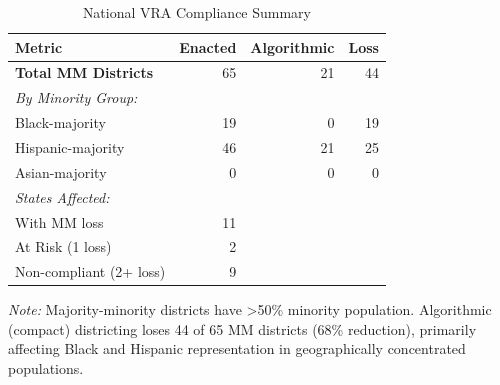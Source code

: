 \begin{table}[t]
\caption{National VRA Compliance Summary}
\label{tab:vra-summary}
\centering
\begin{tabular}{@{}lrrr@{}}
\toprule
\textbf{Metric} & \textbf{Enacted} & \textbf{Algorithmic} & \textbf{Loss} \\
\midrule
\textbf{Total MM Districts} & 65 & 21 & 44 \\
\midrule
\textit{By Minority Group:} & & & \\
Black-majority & 19 & 0 & 19 \\
Hispanic-majority & 46 & 21 & 25 \\
Asian-majority & 0 & 0 & 0 \\
\midrule
\textit{States Affected:} & & & \\
With MM loss & 11 & & \\
At Risk (1 loss) & 2 & & \\
Non-compliant (2+ loss) & 9 & & \\
\bottomrule
\end{tabular}
\vspace{0.5em}

\footnotesize
\textit{Note:} Majority-minority districts have >50\% minority population.
Algorithmic (compact) districting loses 44 of 65 MM districts (68\% reduction), primarily affecting Black and Hispanic representation in geographically concentrated populations.
\end{table}
